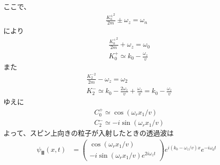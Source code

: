 ここで、
\begin{align}
\frac{{K_{n}^{\pm}}^2}{2m}{\pm}\omega_{z}=\omega_{n}
\end{align}
により
\begin{align}
&\frac{{K_{0}^{+}}^2}{2m}+\omega_{z}=\omega_{0} \\
&K_{0}^{+}{\simeq}k_{0}-\frac{\omega_{z}}{v}
\end{align}
また
\begin{align}
&\frac{{K_{2}^{-}}^2}{2m}-\omega_{z}=\omega_{2} \\
&K_{2}^{-}{\simeq}k_{0}-\frac{2\omega_{z}}{v}+\frac{\omega_{z}}{v}=k_{0}-\frac{\omega_{z}}{v}
\end{align}
ゆえに
\begin{align}
&C_{0}^{+}{\simeq}\cos{({\omega_{r}}x_{1}/{v})} \\
&C_{2}^{-}{\simeq}-i\sin{({\omega_{r}}x_{1}/{v})}
\end{align}
よって、スピン上向きの粒子が入射したときの透過波は
\begin{align}
{\psi}_{Ⅲ}(x,t)
&=\begin{pmatrix}
\cos({{\omega_{r}}x_{1}/v}) \\
-i\sin({{\omega_{r}}x_{1}/v})e^{2i\omega_{z}t}
\end{pmatrix} 
e^{i(k_{0}-\omega_{z}/v)x}e^{-i\omega_{0}t}
\end{align}
